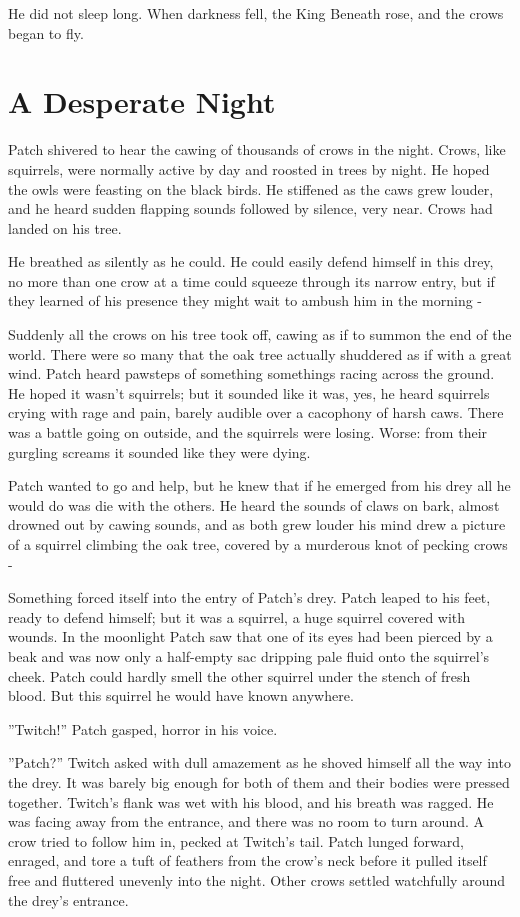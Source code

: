 \documentclass[12pt]{book}
\begin{document}
He did not sleep long. When darkness fell, the King Beneath rose, and the crows began to fly.


\section{A Desperate Night}

Patch shivered to hear the cawing of thousands of crows in the night. Crows, like squirrels, were normally active by day and roosted in trees by night. He hoped the owls were feasting on the black birds. He stiffened as the caws grew louder, and he heard sudden flapping sounds followed by silence, very near. Crows had landed on his tree.

He breathed as silently as he could. He could easily defend himself in this drey, no more than one crow at a time could squeeze through its narrow entry, but if they learned of his presence they might wait to ambush him in the morning -

Suddenly all the crows on his tree took off, cawing as if to summon the end of the world. There were so many that the oak tree actually shuddered as if with a great wind. Patch heard pawsteps of something %
somethings %
racing across the ground. He hoped it wasn't squirrels; but it sounded like it was, yes, he heard squirrels crying with rage and pain, barely audible over a cacophony of harsh caws. There was a battle going on outside, and the squirrels were losing. Worse: from their gurgling screams it sounded like they were dying.

Patch wanted to go and help, but he knew that if he emerged from his drey all he would do was die with the others. He heard the sounds of claws on bark, almost drowned out by cawing sounds, and as both grew louder his mind drew a picture of a squirrel climbing the oak tree, covered by a murderous knot of pecking crows -

Something forced itself into the entry of Patch's drey. Patch leaped to his feet, ready to defend himself; but it was a squirrel, a huge squirrel covered with wounds. In the moonlight Patch saw that one of its eyes had been pierced by a beak and was now only a half-empty sac dripping pale fluid onto the squirrel's cheek. Patch could hardly smell the other squirrel under the stench of fresh blood. But this squirrel he would have known anywhere.

''Twitch!'' Patch gasped, horror in his voice.

''Patch?'' Twitch asked with dull amazement as he shoved himself all the way into the drey. It was barely big enough for both of them and their bodies were pressed together. Twitch's flank was wet with his blood, and his breath was ragged. He was facing away from the entrance, and there was no room to turn around. A crow tried to follow him in, pecked at Twitch's tail. Patch lunged forward, enraged, and tore a tuft of feathers from the crow's neck before it pulled itself free and fluttered unevenly into the night. Other crows settled watchfully around the drey's entrance.
\end{document}
